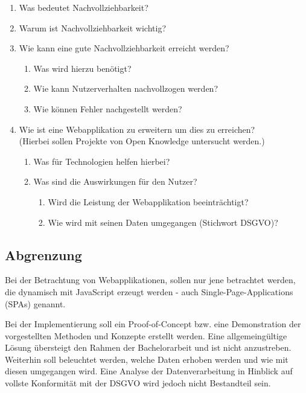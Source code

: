 \begin{enumerate}
	\item Was bedeutet Nachvollziehbarkeit?
	\item Warum ist Nachvollziehbarkeit wichtig?
	\item Wie kann eine gute Nachvollziehbarkeit erreicht werden?
	\begin{enumerate}
		\item Was wird hierzu benötigt?
		\item Wie kann Nutzerverhalten nachvollzogen werden?
		\item Wie können Fehler nachgestellt werden?
	\end{enumerate}
	\item Wie ist eine Webapplikation zu erweitern um dies zu erreichen? \\ (Hierbei sollen Projekte von Open Knowledge untersucht werden.)
	\begin{enumerate}
		\item Was für Technologien helfen hierbei?
		\item Was sind die Auswirkungen für den Nutzer?
		\begin{enumerate}
			\item Wird die Leistung der Webapplikation beeinträchtigt?
			\item Wie wird mit seinen Daten umgegangen (Stichwort DSGVO)?
		\end{enumerate}
	\end{enumerate}
\end{enumerate}


\subsection{Abgrenzung}


Bei der Betrachtung von Webapplikationen, sollen nur jene betrachtet werden, die dynamisch mit JavaScript erzeugt werden - auch Single-Page-Applications (SPAs) genannt.


Bei der Implementierung soll ein Proof-of-Concept bzw. eine Demonstration der vorgestellten Methoden und Konzepte erstellt werden. Eine allgemeingültige Lösung übersteigt den Rahmen der Bachelorarbeit und ist nicht anzustreben. Weiterhin soll beleuchtet werden, welche Daten erhoben werden und wie mit diesen umgegangen wird. Eine Analyse der Datenverarbeitung in Hinblick auf vollste Konformität mit der DSGVO wird jedoch nicht Bestandteil sein.

